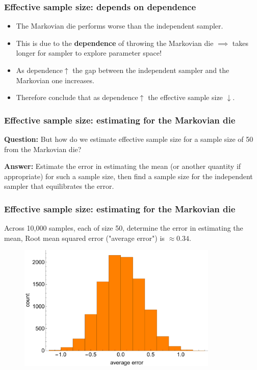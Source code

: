 \documentclass[handout]{beamer}
\begin{document}
\begin{frame}
	\frametitle{Effective sample size: depends on dependence}
	\begin{itemize}
		\item<2-> The Markovian die performs worse than the independent sampler.
		\item<3-> This is due to the \textbf{dependence} of throwing the Markovian die \onslide<4-> $\implies$ takes longer for sampler to explore parameter space!
		\item<5-> As dependence$\uparrow$ the gap between the independent sampler and the Markovian one increases.
		\item<6-> Therefore conclude that as dependence$\uparrow$ the effective sample size $\downarrow$.
	\end{itemize}
	
	
\end{frame}


\begin{frame}
	\frametitle{Effective sample size: estimating for the Markovian die}
	 \textbf{Question:} But how do we estimate effective sample size for a sample size of 50 from the Markovian die?
	
	\vspace{0.2cm}
	
	 \textbf{Answer:} Estimate the error in estimating the mean (or another quantity if appropriate) for such a sample size, then find a sample size for the independent sampler that equilibrates the error.
	
\end{frame}

\begin{frame}
	\frametitle{Effective sample size:  estimating for the Markovian die}
	 Across 10,000 samples, each of size 50, determine the error in estimating the mean,
	\onslide<4-> Root mean squared error ("average error") is $\approx 0.34$.   
	
	\begin{figure}[ht]
		\centerline{\includegraphics[width=0.85\textwidth]{./Figures/lec6_MarkovianDie_averageError.pdf}}
	\end{figure}
	
	
	
\end{frame}
\end{document}
